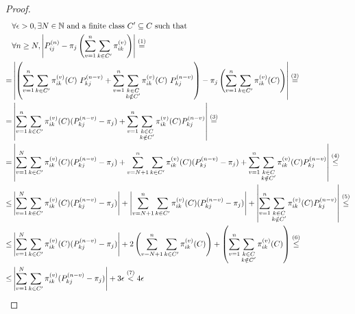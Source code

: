 \begin{proof}
		\setlength{\mathindent}{-1.5cm} %

		\begin{equation}\begin{split} \label{eq:theorem_3.1_first term}
			& \forall \epsilon > 0, \exists N \in \mathbb{N} \text{ and a finite class } C' \subseteq C \text{ such that } \\
			& \forall n \ge N, \left| P_{ij}^{(n)} - \pi_j \left( \sum_{v = 1}^{n} \sum_{k \in C'} \pi_{ik}^{(v)} \right) \right| \stackrel{(1)}{=}
			\\
			= & \left|
				\left(
					\sum_{v = 1}^{n} \sum_{k \in C'} \pi_{ik}^{(v)}(C) ~ P_{kj}^{(n-v)} + \sum_{v = 1}^{n} \sum_{\substack{k \in C \\ k \notin C'}} \pi_{ik}^{(v)}(C) ~ P_{kj}^{(n-v)} \right)
				- \pi_j \left( \sum_{v = 1}^{n} \sum_{k \in C'} \pi_{ik}^{(v)}(C) \right)
				\right| \stackrel{(2)}{=}
			\\
			= & \left| \sum_{v = 1}^{n} \sum_{k \in C'} \pi_{ik}^{(v)}(C) (P_{kj}^{(n-v)} - \pi_j)
				+ \sum_{v = 1}^{n} \sum_{\substack{k \in C \\ k \notin C'}} \pi_{ik}^{(v)}(C) P_{kj}^{(n-v)} \right| \stackrel{(3)}{=}
			\\
			= & \left| \sum_{v = 1}^{N} \sum_{k \in C'} \pi_{ik}^{(v)}(C) (P_{kj}^{(n-v)} - \pi_j) +
				\sum_{v = N+1}^{n} \sum_{k \in C'} \pi_{ik}^{(v)}(C) (P_{kj}^{(n-v)} - \pi_j) +
				\sum_{v = 1}^{n} \sum_{\substack{k \in C \\ k \notin C'}} \pi_{ik}^{(v)}(C) P_{kj}^{(n-v)} \right| \stackrel{(4)}{\le}
			\\
			\le & \left| \sum_{v = 1}^{N} \sum_{k \in C'} \pi_{ik}^{(v)}(C) (P_{kj}^{(n-v)} - \pi_j) \right| +
				\left| \sum_{v = N+1}^{n} \sum_{k \in C'} \pi_{ik}^{(v)}(C) (P_{kj}^{(n-v)} - \pi_j) \right| +
				\left| \sum_{v = 1}^{n} \sum_{\substack{k \in C \\ k \notin C'}} \pi_{ik}^{(v)}(C) P_{kj}^{(n-v)} \right| \stackrel{(5)}{\le}
			\\
			\le & \left| \sum_{v = 1}^{N} \sum_{k \in C'} \pi_{ik}^{(v)}(C) (P_{kj}^{(n-v)} - \pi_j) \right| +
				2 \left( \sum_{v = N+1}^{n} \sum_{k \in C'} \pi_{ik}^{(v)}(C) \right) +
				\left( \sum_{v = 1}^{n} \sum_{\substack{k \in C \\ k \notin C'}} \pi_{ik}^{(v)}(C) \right) \stackrel{(6)}{\le}
			\\
			\le & \left| \sum_{v = 1}^{N} \sum_{k \in C'} \pi_{ik}^{(v)} (P_{kj}^{(n-v)} - \pi_j) \right| + 3 \epsilon \stackrel{(7)}{<} 4 \epsilon
		\end{split}\end{equation}


\end{proof}
